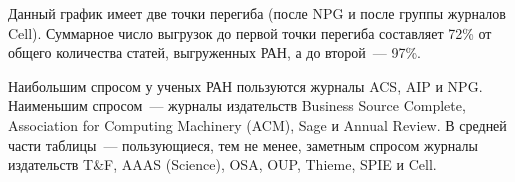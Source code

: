 \begin{multicols}{2}
    
     Данный график имеет две точки перегиба (после NPG 
и после группы журналов Cell). Суммарное число выгрузок до первой точки 
перегиба составляет 72\% от общего количества статей, выгруженных РАН, а 
до второй~--- 97\%.
     
      Наибольшим спросом у ученых РАН пользуются журналы ACS, AIP и NPG. 
Наименьшим спросом~--- журналы издательств Business Source Complete, 
Association for Computing Machinery (ACM), Sage и Annual Review. В средней 
части таблицы~--- пользующиеся, тем не менее, заметным спросом журналы 
издательств T\&F, AAAS (Science), OSA, 
OUP, Thieme, SPIE и Cell. 

\begin{table*}[b]\small
\vspace*{-6pt}
\begin{center}
\vspace*{2ex}


\end{center}
\end{table*}
\end{multicols}
